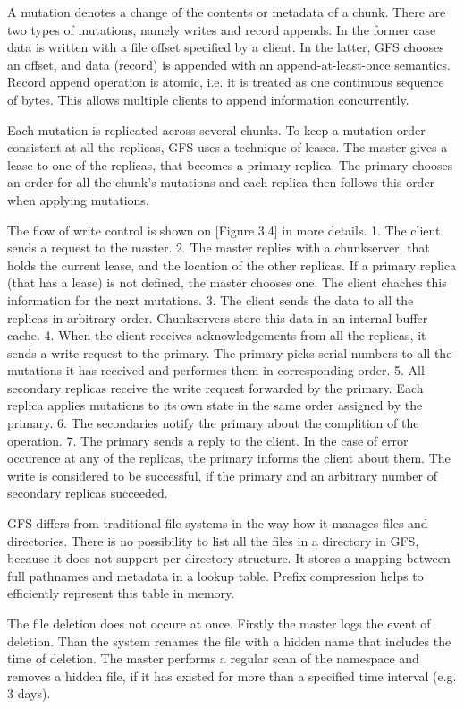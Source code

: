 A mutation denotes a change of the contents or metadata of a chunk.
There are two types of mutations, namely writes and record appends.
In the former case data is written with a file offset specified by a client.
In the latter, GFS chooses an offset, and data (record) is appended with an append-at-least-once semantics.
Record append operation is atomic, i.e. it is treated as one continuous sequence of bytes. 
This allows multiple clients to append information concurrently.

Each mutation is replicated across several chunks.
To keep a mutation order consistent at all the replicas, GFS uses a technique of leases.
The master gives a lease to one of the replicas, that becomes a primary replica.
The primary chooses an order for all the chunk's mutations and each replica then follows this order when applying mutations.

The flow of write control is shown on [Figure 3.4] in more details.
1. The client sends a request to the master.
2. The master replies with a chunkserver, that holds the current lease, and the location of the other replicas.
If a primary replica (that has a lease) is not defined, the master chooses one. 
The client chaches this information for the next mutations.
3. The client sends the data to all the replicas in arbitrary order.
Chunkservers store this data in an internal buffer cache. 
4. When the client receives acknowledgements from all the replicas, it sends a write request to the primary.
The primary picks serial numbers to all the mutations it has received and performes them in corresponding order.
5. All secondary replicas receive the write request forwarded by the primary.
Each replica applies mutations to its own state in the same order assigned by the primary.
6. The secondaries notify the primary about the complition of the operation.
7. The primary sends a reply to the client.
In the case of error occurence at any of the replicas, the primary informs the client about them.
The write is considered to be successful, if the primary and an arbitrary number of secondary replicas succeeded.

GFS differs from traditional file systems in the way how it manages files and directories.
There is no possibility to list all the files in a directory in GFS, because it does not support per-directory structure.
It stores a mapping between full pathnames and metadata in a lookup table.
Prefix compression helps to efficiently represent this table in memory. 

The file deletion does not occure at once.
Firstly the master logs the event of deletion.
Than the system renames the file with a hidden name that includes the time of deletion.
The master performs a regular scan of the namespace and removes a hidden file, if it has existed for more than a specified time interval (e.g. 3 days). 

